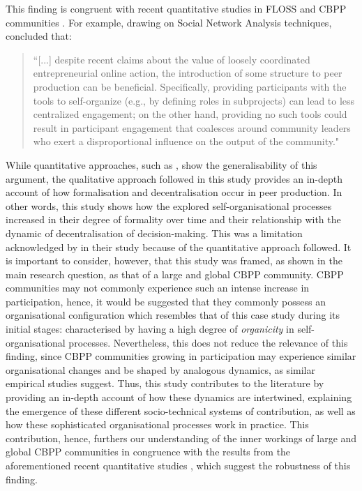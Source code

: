 This finding is congruent with recent quantitative studies in FLOSS \parencite[e.g.][]{schweik2013preliminary} and CBPP communities \parencite[e.g.][]{wang2016institutional}. For example, drawing on Social Network Analysis techniques, \textcite[4]{wang2016institutional} concluded that:

\begin{quotation}
``[...] despite recent  claims  about  the value  of  loosely coordinated entrepreneurial  online  action,  the  introduction of  some structure  to  peer production  can  be  beneficial. Specifically,  providing  participants  with  the  tools  to self-organize  (e.g.,  by defining  roles  in  subprojects)  can lead  to  less  centralized  engagement; on the other hand, providing no such tools could result in participant engagement that coalesces around community leaders who exert a disproportional influence on the output of the community."
\end{quotation}

While quantitative approaches, such as \textcite{wang2016institutional}, show the generalisability of this argument, the qualitative approach followed in this study provides an in-depth account of how formalisation and decentralisation occur in peer production. In other words, this study shows how the explored self-organisational processes increased in their degree of formality over time and their relationship with the dynamic of decentralisation of decision-making. This was a limitation acknowledged by \textcite[18]{wang2016institutional} in their study because of the quantitative approach followed. It is important to consider, however, that this study was framed, as shown in the main research question, as that of a large and global CBPP community. CBPP communities may not commonly experience such an intense increase in participation, hence, it would be suggested that they commonly possess an organisational configuration which resembles that of this case study during its initial stages: characterised by having a high degree of \textit{organicity} in self-organisational processes. Nevertheless, this does not reduce the relevance of this finding, since CBPP communities growing in participation may experience similar organisational changes and be shaped by analogous dynamics, as similar empirical studies \parencite{viegas2007hidden, forte2009decentralization} suggest. Thus, this study contributes to the literature by providing an in-depth account of how these dynamics are intertwined, explaining the emergence of these different socio-technical systems of contribution, as well as how these sophisticated organisational processes work in practice. This contribution, hence, furthers our understanding of the inner workings of large and global CBPP communities in congruence with the results from the aforementioned recent quantitative studies \parencite{schweik2013preliminary, wang2016institutional}, which suggest the robustness of this finding.

